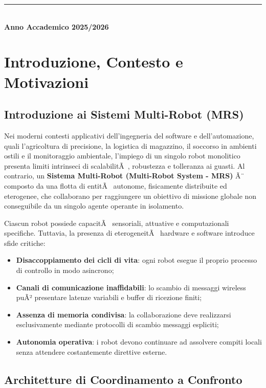 ﻿\documentclass[11pt, a4paper]{report}
\begin{document}
\begin{titlepage}
    \vfill
    \rule{0.4\textwidth}{0.5pt}\\[6pt]
    {\small\bfseries\color{primaryColor} Anno Accademico 2025/2026}
\end{titlepage}

\tableofcontents
\clearpage

\chapter{Introduzione, Contesto e Motivazioni}

\section{Introduzione ai Sistemi Multi-Robot (MRS)}

Nei moderni contesti applicativi dell'ingegneria del software e dell'automazione, quali l'agricoltura di precisione, la logistica di magazzino, il soccorso in ambienti ostili e il monitoraggio ambientale, l'impiego di un singolo robot monolitico presenta limiti intrinseci di scalabilitÃ , robustezza e tolleranza ai guasti. Al contrario, un \textbf{Sistema Multi-Robot (Multi-Robot System - MRS)} Ã¨ composto da una flotta di entitÃ  autonome, fisicamente distribuite ed eterogenee, che collaborano per raggiungere un obiettivo di missione globale non conseguibile da un singolo agente operante in isolamento.

Ciascun robot possiede capacitÃ  sensoriali, attuative e computazionali specifiche. Tuttavia, la presenza di eterogeneitÃ  hardware e software introduce sfide critiche:
\begin{itemize}
    \item \textbf{Disaccoppiamento dei cicli di vita}: ogni robot esegue il proprio processo di controllo in modo asincrono;
    \item \textbf{Canali di comunicazione inaffidabili}: lo scambio di messaggi wireless puÃ² presentare latenze variabili e buffer di ricezione finiti;
    \item \textbf{Assenza di memoria condivisa}: la collaborazione deve realizzarsi esclusivamente mediante protocolli di scambio messaggi espliciti;
    \item \textbf{Autonomia operativa}: i robot devono continuare ad assolvere compiti locali senza attendere costantemente direttive esterne.
\end{itemize}

\section{Architetture di Coordinamento a Confronto}
\end{document}
